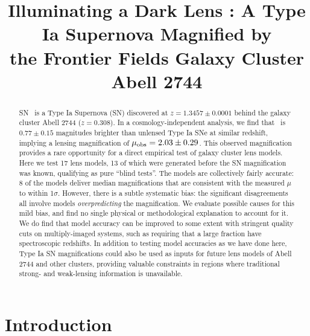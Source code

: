 



\title{Illuminating a Dark Lens : A Type Ia Supernova Magnified by \\ the Frontier Fields Galaxy Cluster Abell 2744}




\begin{abstract}
{
SN \tomas\ is a Type Ia Supernova (SN) discovered at
$z=1.3457\pm0.0001$ behind the galaxy cluster Abell 2744 ($z=0.308$).
In a cosmology-independent analysis, we find that \tomas\ is
$0.77\pm0.15$ magnitudes brighter than unlensed Type Ia SNe at similar
redshift, implying a lensing magnification of $\mu_{\rm
obs}=2.03\pm0.29$.  This observed magnification provides a rare
opportunity for a direct empirical test of galaxy cluster lens models.
Here we test 17 lens models, 13 of which were generated before the SN
magnification was known, qualifying as pure ``blind tests''.  The
models are collectively fairly accurate: 8 of the models deliver
median magnifications that are consistent with the measured $\mu$ to
within 1$\sigma$.  However, there is a subtle systematic bias: the
significant disagreements all involve models {\it overpredicting} the
magnification. We evaluate possible causes for this mild bias, and
find no single physical or methodological explanation to account for
it.  We do find that model accuracy can be improved to some extent
with stringent quality cuts on multiply-imaged systems, such as
requiring that a large fraction have spectroscopic redshifts.  In
addition to testing model accuracies as we have done here, Type Ia SN
magnifications could also be used as inputs for future lens models of
Abell 2744 and other clusters, providing valuable constraints in
regions where traditional strong- and weak-lensing information is
unavailable.}
\end{abstract}


\section{Introduction}
\label{sec:Introduction}

